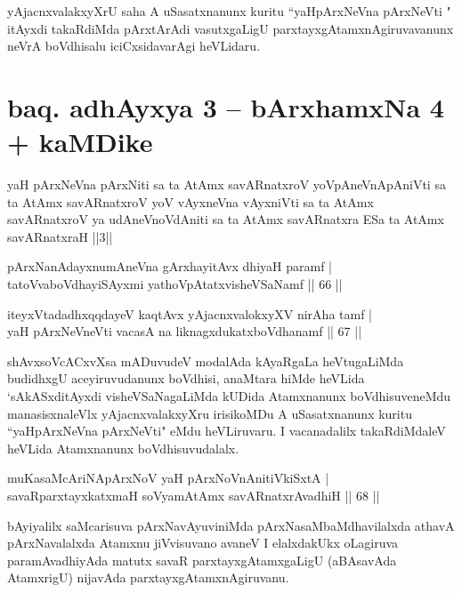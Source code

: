 \begin{artha}
yAjacnxvalakxyXrU saha A uSasatxnanunx kuritu ``yaHpArxNeVna pArxNeVti " itAyxdi takaRdiMda pArxtArAdi vasutxgaLigU parxtayxgAtamxnAgiruvavanunx neVrA boVdhisalu iciCxsidavarAgi heVLidaru.
\end{artha}

\section*{baq. adhAyxya 3 -- bArxhamxNa 4 + kaMDike}

\begin{shl}
yaH pArxNeVna pArxNiti sa ta AtAmx savARnatxroV yoV\s pAneVnApAniVti sa ta AtAmx savARnatxroV yoV vAyxneVna vAyxniVti sa ta AtAmx savARnatxroV ya udAneVnoVdAniti sa ta AtAmx savARnatxra ESa ta AtAmx savARnatxraH ||3||
\end{shl}

\begin{shl}
pArxNanAdayxnumAneVna gArxhayitAvx dhiyaH paramf |\\
tatoV\s vaboVdhayiSAyxmi yathoVpAtatxvisheVSaNamf \hfill || 66 ||
\end{shl}

\begin{shl}
iteyxVtadadhxqqdayeV kaqtAvx yAjacnxvalokxyXV nirAha tamf |\\
yaH pArxNeVneVti vacasA na liknagxdukatxboVdhanamf \hfill || 67 ||
\end{shl}

\begin{artha}
shAvxsoVcACxvXsa mADuvudeV modalAda kAyaRgaLa heVtugaLiMda budidhxgU aceyiruvudanunx boVdhisi, anaMtara hiMde heVLida `sAkASxditAyxdi visheVSaNagaLiMda kUDida Atamxnanunx boVdhisuveneMdu manasisxnaleVlx yAjacnxvalakxyXru irisikoMDu A uSasatxnanunx kuritu ``yaHpArxNeVna pArxNeVti" eMdu heVLiruvaru. I vacanadalilx takaRdiMdaleV heVLida Atamxnanunx boVdhisuvudalalx.
\end{artha}%


\begin{shl}
muKasaMcAriNA\s pArxNoV yaH pArxNoVnAnitiVkiSxtA |\\
savaRparxtayxkatxmaH soV\s yamAtAmx savARnatxrAvadhiH \hfill || 68 ||
\end{shl}

\begin{artha}
bAyiyalilx saMcarisuva pArxNavAyuviniMda pArxNasaMbaMdhavilalxda athavA pArxNavalalxda Atamxnu jiVvisuvano avaneV I elalxdakUkx oLagiruva paramAvadhiyAda matutx savaR parxtayxgAtamxgaLigU (aBAsavAda AtamxrigU) nijavAda parxtayxgAtamxnAgiruvanu.
\end{artha}

